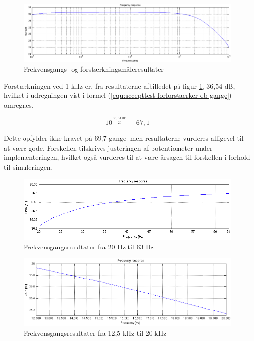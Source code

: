 \begin{figure}[h]
\centering
\includegraphics[width=\textwidth]{maalerapporter/forforstaerker/frekvensrespons-forforstaerker.png}
\caption{Frekvensgangs- og forstærkningsmåleresultater}
\label{fig:accepttest-fresultat-forforstaerker}
\end{figure}

Forstærkningen ved 1 kHz er, fra resultaterne afbilledet på figur \ref{fig:accepttest-fresultat-forforstaerker}, 36,54 dB, hvilket i udregningen vist i formel (\ref{equ:accepttest-forforstaerker-db-gange}) omregnes.

\begin{equation}
\label{equ:accepttest-forforstaerker-db-gange}
10^{\frac{\mathrm{36,54~dB}}{20}} = 67,1
\end{equation}

Dette opfylder ikke kravet på 69,7 gange, men resultaterne vurderes alligevel til at være gode. Forskellen tilskrives justeringen af potentiometer under implementeringen, hvilket også vurderes til at være årsagen til forskellen i forhold til simuleringen. 

\begin{figure}[h]
\centering
\includegraphics[width=\textwidth]{maalerapporter/forforstaerker/fr20-63.png}
\caption{Frekvensgangsresultater fra 20 Hz til 63 Hz}
\label{fig:accepttest-fres-20-63}
\end{figure}

\begin{figure}[h]
\centering
\includegraphics[width=\textwidth]{maalerapporter/forforstaerker/fr12-20k.png}
\caption{Frekvensgangsresultater fra 12,5 kHz til 20 kHz}
\label{fig:accepttest-fres-125-20}
\end{figure}

